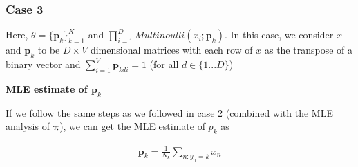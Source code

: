 \documentclass{article}
\begin{document}
\begin{addmargin}{1.5em}
\begin{addmargin}{1.5em}
\begin{addmargin}{1.5em}
        \end{addmargin}
        
        \subsubsection*{Case 3}
        \begin{addmargin}{1.5em}
        
            Here, $\theta = \{\boldsymbol{p}_k\}_{k = 1}^{K}$ and $\prod_{i = 1}^{D} Multinoulli(x_i; \boldsymbol{p}_k)$. In this case, we consider $x$ and $\boldsymbol{p}_k$ to be $D \times V$ dimensional matrices with each row of $x$ as the transpose of a binary vector and $\sum_{i = 1}^{V} \boldsymbol{p}_{kdi} = 1$ (for all $d \in \{1 ... D\}$)
            
            \textbf{MLE estimate of $\boldsymbol{p}_k$}
            
            If we follow the same steps as we followed in case 2 (combined with the MLE analysis of $\boldsymbol{\pi}$), we can get the MLE estimate of $p_k$ as
            
            \begin{align*}
                \boldsymbol{p}_k = \frac{1}{N_k} \sum_{n:y_n = k} x_n
            \end{align*}
            
        \end{addmargin}
        
    \end{addmargin}
    
\end{addmargin}


\clearpage
\end{document}
